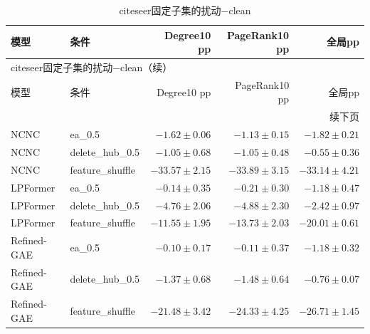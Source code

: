 \documentclass[UTF8,a4paper,11pt,fontset=fandol]{ctexart}
\begin{document}
{\footnotesize
\setlength{\tabcolsep}{3pt}
\begin{longtable}{llrrr}
\caption{citeseer固定子集的扰动−clean}\\
\toprule
模型 & 条件 & Degree10 pp & PageRank10 pp & 全局pp \\
\midrule
\endfirsthead
\multicolumn{5}{l}{citeseer固定子集的扰动−clean（续）}\\
\toprule
模型 & 条件 & Degree10 pp & PageRank10 pp & 全局pp \\
\midrule
\endhead
\midrule\multicolumn{5}{r}{续下页}\\
\endfoot
\bottomrule\endlastfoot
NCNC & ea\_0.5 & $-1.62\pm0.06$ & $-1.13\pm0.15$ & $-1.82\pm0.21$ \\
NCNC & delete\_hub\_0.5 & $-1.05\pm0.68$ & $-1.05\pm0.48$ & $-0.55\pm0.36$ \\
NCNC & feature\_shuffle & $-33.57\pm2.15$ & $-33.89\pm3.15$ & $-33.14\pm4.21$ \\
LPFormer & ea\_0.5 & $-0.14\pm0.35$ & $-0.21\pm0.30$ & $-1.18\pm0.47$ \\
LPFormer & delete\_hub\_0.5 & $-4.76\pm2.06$ & $-4.88\pm2.30$ & $-2.42\pm0.97$ \\
LPFormer & feature\_shuffle & $-11.55\pm1.95$ & $-13.73\pm2.03$ & $-20.01\pm0.61$ \\
Refined-GAE & ea\_0.5 & $-0.10\pm0.17$ & $-0.11\pm0.37$ & $-1.18\pm0.32$ \\
Refined-GAE & delete\_hub\_0.5 & $-1.37\pm0.68$ & $-1.48\pm0.64$ & $-0.76\pm0.07$ \\
Refined-GAE & feature\_shuffle & $-21.48\pm3.42$ & $-24.33\pm4.25$ & $-26.71\pm1.45$ \\
\end{longtable}
}
\end{document}
